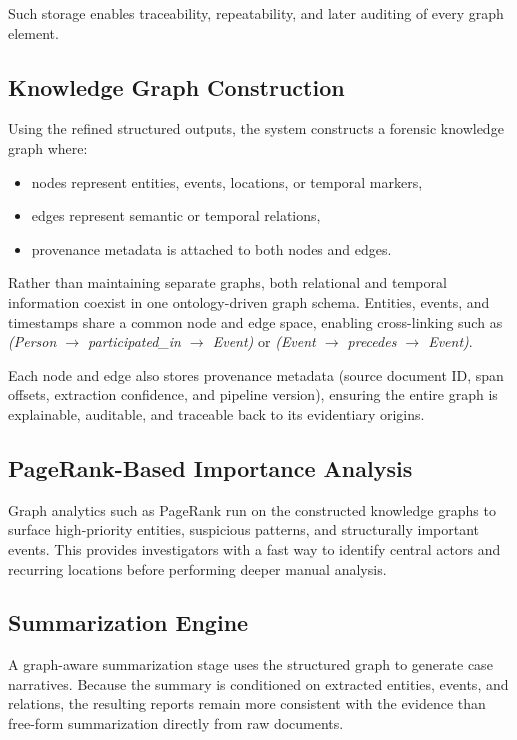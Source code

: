 \documentclass{ieeeaccess}
\begin{document}
Such storage enables traceability, repeatability, and later auditing of every graph element.

\subsection{Knowledge Graph Construction}
Using the refined structured outputs, the system constructs a forensic knowledge graph where:
\begin{itemize}
    \item nodes represent entities, events, locations, or temporal markers,
    \item edges represent semantic or temporal relations,
    \item provenance metadata is attached to both nodes and edges.
\end{itemize}

Rather than maintaining separate graphs, both relational and temporal information coexist in one ontology-driven graph schema. Entities, events, and timestamps share a common node and edge space, enabling cross-linking such as \textit{(Person $\rightarrow$ participated\allowbreak\_in $\rightarrow$ Event)} or \textit{(Event $\rightarrow$ precedes $\rightarrow$ Event)}.

Each node and edge also stores provenance metadata (source document ID, span offsets, extraction confidence, and pipeline version), ensuring the entire graph is explainable, auditable, and traceable back to its evidentiary origins.

\subsection{PageRank-Based Importance Analysis}
Graph analytics such as PageRank run on the constructed knowledge graphs to surface high-priority entities, suspicious patterns, and structurally important events. This provides investigators with a fast way to identify central actors and recurring locations before performing deeper manual analysis.

\subsection{Summarization Engine}
A graph-aware summarization stage uses the structured graph to generate case narratives. Because the summary is conditioned on extracted entities, events, and relations, the resulting reports remain more consistent with the evidence than free-form summarization directly from raw documents.
\end{document}
